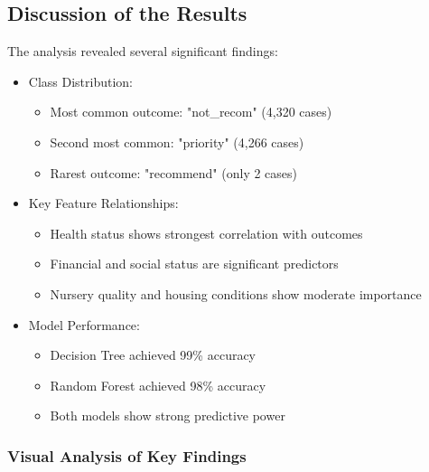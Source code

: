 \subsection{Discussion of the Results}
The analysis revealed several significant findings:

\begin{itemize}
    \item Class Distribution:
    \begin{itemize}
        \item Most common outcome: "not\_recom" (4,320 cases)
        \item Second most common: "priority" (4,266 cases)
        \item Rarest outcome: "recommend" (only 2 cases)
    \end{itemize}
    
    \item Key Feature Relationships:
    \begin{itemize}
        \item Health status shows strongest correlation with outcomes
        \item Financial and social status are significant predictors
        \item Nursery quality and housing conditions show moderate importance
    \end{itemize}
    
    \item Model Performance:
    \begin{itemize}
        \item Decision Tree achieved 99\% accuracy
        \item Random Forest achieved 98\% accuracy
        \item Both models show strong predictive power
    \end{itemize}
\end{itemize}

\subsubsection{Visual Analysis of Key Findings}

